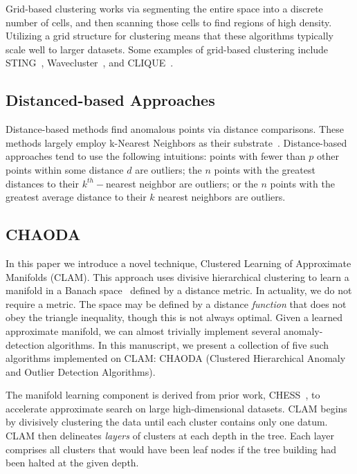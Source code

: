 Grid-based clustering works via segmenting the entire space into a discrete number of cells, and then scanning those cells to find regions of high density.
Utilizing a grid structure for clustering means that these algorithms typically scale well to larger datasets.
Some examples of grid-based clustering include
STING~\cite{wang1997sting},
Wavecluster~\cite{sheikholeslami2000wavecluster}, and
CLIQUE~\cite{agrawal1998automatic}.

\subsection{Distanced-based Approaches}
\label{subsec:related-works:distanced-based-approaches}

Distance-based methods find anomalous points via distance comparisons.
These methods largely employ k-Nearest Neighbors as their substrate~\cite{wang2019progress}.
Distance-based approaches tend to use the following intuitions:
points with fewer than $p$ other points within some distance $d$ are outliers;
the $n$ points with the greatest distances to their $k^{th}-$nearest neighbor are outliers;
or the $n$ points with the greatest average distance to their $k$ nearest neighbors are outliers.

\subsection{CHAODA}
\label{subsec:related-works:chaoda}

In this paper we introduce a novel technique, Clustered Learning of Approximate Manifolds (CLAM).
This approach uses divisive hierarchical clustering to learn a manifold in a Banach space~\cite{banach1929fonctionnelles} defined by a distance metric.
In actuality, we do not require a metric.
The space may be defined by a distance \textit{function} that does not obey the triangle inequality, though this is not always optimal.
Given a learned approximate manifold, we can almost trivially implement several anomaly-detection algorithms.
In this manuscript, we present a collection of five such algorithms implemented on CLAM: CHAODA (Clustered Hierarchical Anomaly and Outlier Detection Algorithms).

The manifold learning component is derived from prior work, CHESS~\cite{ishaq2019entropy}, to accelerate approximate search on large high-dimensional datasets.
CLAM begins by divisively clustering the data until each cluster contains only one datum.
CLAM then delineates \textit{layers} of clusters at each depth in the tree.
Each layer comprises all clusters that would have been leaf nodes if the tree building had been halted at the given depth.


